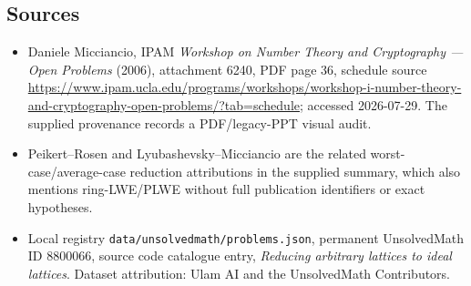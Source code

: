 \documentclass[11pt]{article}
\begin{document}
\subsection{Sources}
\begin{itemize}
\item Daniele Micciancio, IPAM \emph{Workshop on Number Theory and Cryptography --- Open Problems} (2006), attachment 6240, PDF page 36, schedule source \url{https://www.ipam.ucla.edu/programs/workshops/workshop-i-number-theory-and-cryptography-open-problems/?tab=schedule}; accessed 2026-07-29. The supplied provenance records a PDF/legacy-PPT visual audit.
\item Peikert--Rosen and Lyubashevsky--Micciancio are the related worst-case/average-case reduction attributions in the supplied summary, which also mentions ring-LWE/PLWE without full publication identifiers or exact hypotheses.
\item Local registry \texttt{data/unsolvedmath/problems.json}, permanent UnsolvedMath ID $8800066$, source code catalogue entry, \emph{Reducing arbitrary lattices to ideal lattices}. Dataset attribution: Ulam AI and the UnsolvedMath Contributors.
\end{itemize}
\end{document}
